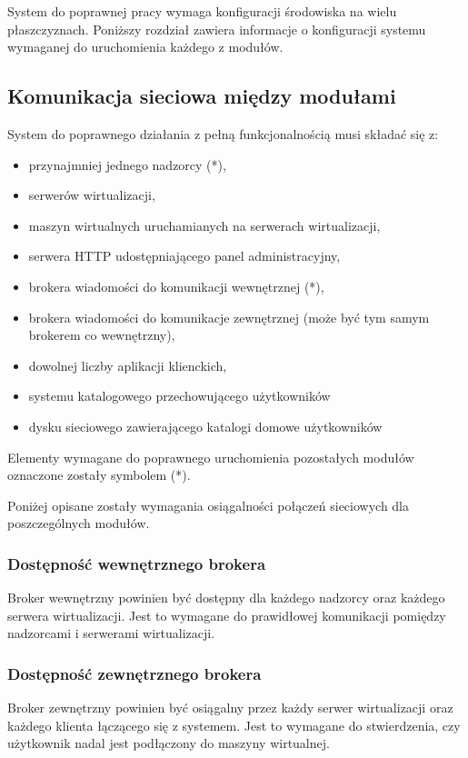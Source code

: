 \documentclass[../opis-rozwiazania.tex]{subfiles}
\begin{document}
\label{system_requirements}

System do poprawnej pracy wymaga konfiguracji środowiska na wielu płaszczyznach. Poniższy rozdział zawiera informacje o konfiguracji systemu wymaganej do uruchomienia każdego z modułów.

\subsection{Komunikacja sieciowa między modułami}
System do poprawnego działania z pełną funkcjonalnością musi składać się z:
\begin{itemize}
  \item przynajmniej jednego nadzorcy (*),
  \item serwerów wirtualizacji,
  \item maszyn wirtualnych uruchamianych na serwerach wirtualizacji,
  \item serwera HTTP udostępniającego panel administracyjny,
  \item brokera wiadomości do komunikacji wewnętrznej (*),
  \item brokera wiadomości do komunikacje zewnętrznej (może być tym samym brokerem co wewnętrzny),
  \item dowolnej liczby aplikacji klienckich,
  \item systemu katalogowego przechowującego użytkowników
  \item dysku sieciowego zawierającego katalogi domowe użytkowników
\end{itemize}
Elementy wymagane do poprawnego uruchomienia pozostałych modułów oznaczone zostały symbolem (*).

Poniżej opisane zostały wymagania osiągalności połączeń sieciowych dla poszczególnych modułów.

\subsubsection{Dostępność wewnętrznego brokera}
Broker wewnętrzny powinien być dostępny dla każdego nadzorcy oraz każdego serwera wirtualizacji.
Jest to wymagane do prawidłowej komunikacji pomiędzy nadzorcami i serwerami wirtualizacji.

\subsubsection{Dostępność zewnętrznego brokera}
Broker zewnętrzny powinien być osiągalny przez każdy serwer wirtualizacji oraz każdego klienta łączącego się z systemem.
Jest to wymagane do stwierdzenia, czy użytkownik nadal jest podłączony do maszyny wirtualnej.
\end{document}
